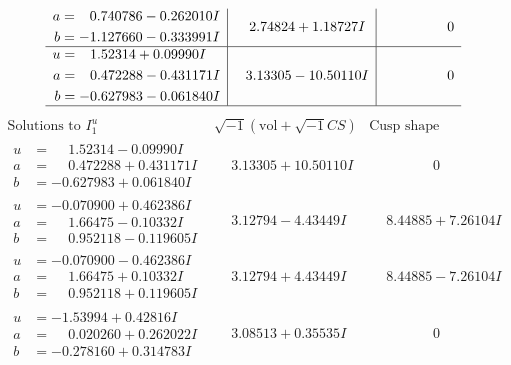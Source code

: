 \documentclass[1p]{elsarticle_modified}
\theoremstyle{definition}
\newcommand{\I}{\sqrt{-1}}
\begin{document}
$$\begin{array}{c|c|c}
\begin{aligned}
a &= \phantom{-}0.740786 - 0.262010 I \\
b &= -1.127660 - 0.333991 I\end{aligned}
 & \phantom{-}2.74824 + 1.18727 I & \phantom{-0.000000 } 0 \\ \hline\begin{aligned}
u &= \phantom{-}1.52314 + 0.09990 I \\
a &= \phantom{-}0.472288 - 0.431171 I \\
b &= -0.627983 - 0.061840 I\end{aligned}
 & \phantom{-}3.13305 - 10.50110 I & \phantom{-0.000000 } 0\\
 \hline 
 \end{array}$$\newpage$$\begin{array}{c|c|c}  
\text{Solutions to }I^u_{1}& \I (\text{vol} + \sqrt{-1}CS) & \text{Cusp shape}\\
 \hline 
\begin{aligned}
u &= \phantom{-}1.52314 - 0.09990 I \\
a &= \phantom{-}0.472288 + 0.431171 I \\
b &= -0.627983 + 0.061840 I\end{aligned}
 & \phantom{-}3.13305 + 10.50110 I & \phantom{-0.000000 } 0 \\ \hline\begin{aligned}
u &= -0.070900 + 0.462386 I \\
a &= \phantom{-}1.66475 - 0.10332 I \\
b &= \phantom{-}0.952118 - 0.119605 I\end{aligned}
 & \phantom{-}3.12794 - 4.43449 I & \phantom{-}8.44885 + 7.26104 I \\ \hline\begin{aligned}
u &= -0.070900 - 0.462386 I \\
a &= \phantom{-}1.66475 + 0.10332 I \\
b &= \phantom{-}0.952118 + 0.119605 I\end{aligned}
 & \phantom{-}3.12794 + 4.43449 I & \phantom{-}8.44885 - 7.26104 I \\ \hline\begin{aligned}
u &= -1.53994 + 0.42816 I \\
a &= \phantom{-}0.020260 + 0.262022 I \\
b &= -0.278160 + 0.314783 I\end{aligned}
 & \phantom{-}3.08513 + 0.35535 I & \phantom{-0.000000 } 0 \\ \hline\begin{aligned}

\end{aligned}
\end{array}$$
\end{document}
